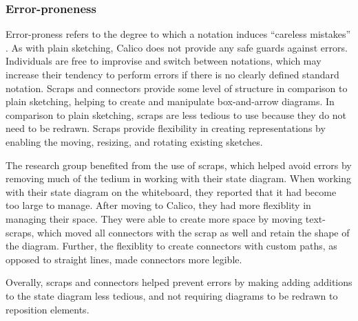 %

\subsubsection{Error-proneness}

Error-proness refers to the degree to which a notation induces ``careless mistakes'' \cite{Petre2013BookChapter}. As with plain sketching, Calico does not provide any safe guards against errors. Individuals are free to improvise and switch between notations, which may increase their tendency to perform errors if there is no clearly defined standard notation. Scraps and connectors provide some level of structure in comparison to plain sketching, helping to create and manipulate box-and-arrow diagrams. In comparison to plain sketching, scraps are less tedious to use because they do not need to be redrawn. Scraps provide flexibility in creating representations by enabling the moving, resizing, and rotating existing sketches.

The research group benefited from the use of scraps, which helped avoid errors by removing much of the tedium in working with their state diagram. When working with their state diagram on the whiteboard, they reported that it had become too large to manage. After moving to Calico, they had more flexiblity in managing their space. They were able to create more space by moving text-scraps, which moved all connectors with the scrap as well and retain the shape of the diagram. Further, the flexiblity to create connectors with custom paths, as opposed to straight lines, made connectors more legible. 

Overally, scraps and connectors helped prevent errors by making adding additions to the state diagram less tedious, and not requiring diagrams to be redrawn to reposition elements.

%


